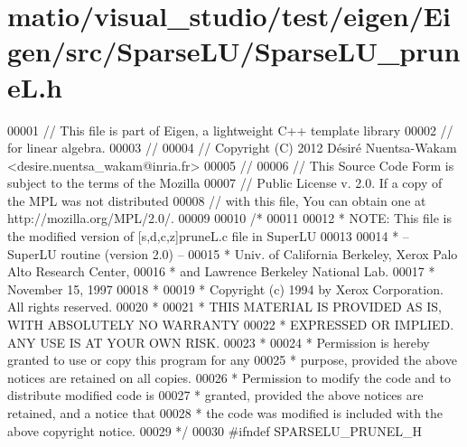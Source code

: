 \hypertarget{matio_2visual__studio_2test_2eigen_2_eigen_2src_2_sparse_l_u_2_sparse_l_u__prune_l_8h_source}{}\section{matio/visual\+\_\+studio/test/eigen/\+Eigen/src/\+Sparse\+L\+U/\+Sparse\+L\+U\+\_\+pruneL.h}
\label{matio_2visual__studio_2test_2eigen_2_eigen_2src_2_sparse_l_u_2_sparse_l_u__prune_l_8h_source}

\begin{DoxyCode}
00001 \textcolor{comment}{// This file is part of Eigen, a lightweight C++ template library}
00002 \textcolor{comment}{// for linear algebra.}
00003 \textcolor{comment}{//}
00004 \textcolor{comment}{// Copyright (C) 2012 Désiré Nuentsa-Wakam <desire.nuentsa\_wakam@inria.fr>}
00005 \textcolor{comment}{//}
00006 \textcolor{comment}{// This Source Code Form is subject to the terms of the Mozilla}
00007 \textcolor{comment}{// Public License v. 2.0. If a copy of the MPL was not distributed}
00008 \textcolor{comment}{// with this file, You can obtain one at http://mozilla.org/MPL/2.0/.}
00009 
00010 \textcolor{comment}{/* }
00011 \textcolor{comment}{ }
00012 \textcolor{comment}{ * NOTE: This file is the modified version of [s,d,c,z]pruneL.c file in SuperLU }
00013 \textcolor{comment}{ }
00014 \textcolor{comment}{ * -- SuperLU routine (version 2.0) --}
00015 \textcolor{comment}{ * Univ. of California Berkeley, Xerox Palo Alto Research Center,}
00016 \textcolor{comment}{ * and Lawrence Berkeley National Lab.}
00017 \textcolor{comment}{ * November 15, 1997}
00018 \textcolor{comment}{ *}
00019 \textcolor{comment}{ * Copyright (c) 1994 by Xerox Corporation.  All rights reserved.}
00020 \textcolor{comment}{ *}
00021 \textcolor{comment}{ * THIS MATERIAL IS PROVIDED AS IS, WITH ABSOLUTELY NO WARRANTY}
00022 \textcolor{comment}{ * EXPRESSED OR IMPLIED.  ANY USE IS AT YOUR OWN RISK.}
00023 \textcolor{comment}{ *}
00024 \textcolor{comment}{ * Permission is hereby granted to use or copy this program for any}
00025 \textcolor{comment}{ * purpose, provided the above notices are retained on all copies.}
00026 \textcolor{comment}{ * Permission to modify the code and to distribute modified code is}
00027 \textcolor{comment}{ * granted, provided the above notices are retained, and a notice that}
00028 \textcolor{comment}{ * the code was modified is included with the above copyright notice.}
00029 \textcolor{comment}{ */}
00030 \textcolor{preprocessor}{#ifndef SPARSELU\_PRUNEL\_H}

\end{DoxyCode}
